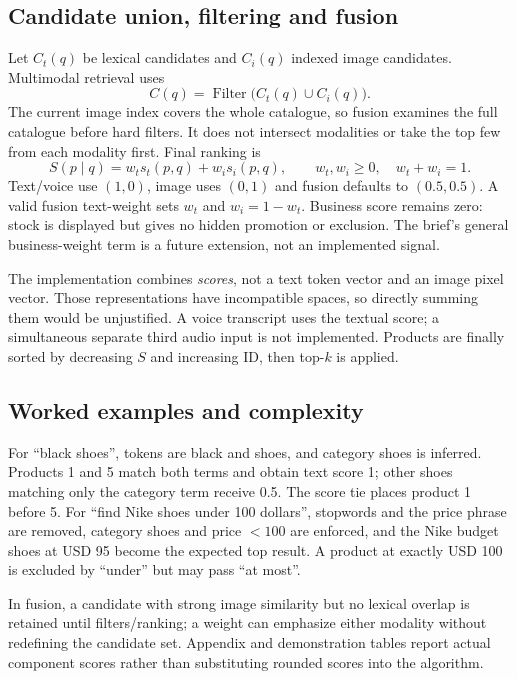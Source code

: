 \documentclass[11pt,a4paper]{article}
\begin{document}
\subsection{Candidate union, filtering and fusion}
Let $C_t(q)$ be lexical candidates and $C_i(q)$ indexed image candidates. Multimodal retrieval uses
\begin{equation}
C(q)=\operatorname{Filter}\big(C_t(q)\cup C_i(q)\big).
\end{equation}
The current image index covers the whole catalogue, so fusion examines the full catalogue before hard filters. It does not intersect modalities or take the top few from each modality first. Final ranking is
\begin{equation}
S(p\mid q)=w_t s_t(p,q)+w_i s_i(p,q),\qquad w_t,w_i\geq0,\quad w_t+w_i=1.
\end{equation}
Text/voice use $(1,0)$, image uses $(0,1)$ and fusion defaults to $(0.5,0.5)$. A valid fusion text-weight sets $w_t$ and $w_i=1-w_t$. Business score remains zero: stock is displayed but gives no hidden promotion or exclusion. The brief's general business-weight term is a future extension, not an implemented signal.

The implementation combines \emph{scores}, not a text token vector and an image pixel vector. Those representations have incompatible spaces, so directly summing them would be unjustified. A voice transcript uses the textual score; a simultaneous separate third audio input is not implemented. Products are finally sorted by decreasing $S$ and increasing ID, then top-$k$ is applied.

\subsection{Worked examples and complexity}
For ``black shoes'', tokens are black and shoes, and category shoes is inferred. Products 1 and 5 match both terms and obtain text score 1; other shoes matching only the category term receive 0.5. The score tie places product 1 before 5. For ``find Nike shoes under 100 dollars'', stopwords and the price phrase are removed, category shoes and price $<100$ are enforced, and the Nike budget shoes at USD 95 become the expected top result. A product at exactly USD 100 is excluded by ``under'' but may pass ``at most''.

In fusion, a candidate with strong image similarity but no lexical overlap is retained until filters/ranking; a weight can emphasize either modality without redefining the candidate set. Appendix and demonstration tables report actual component scores rather than substituting rounded scores into the algorithm.
\end{document}
